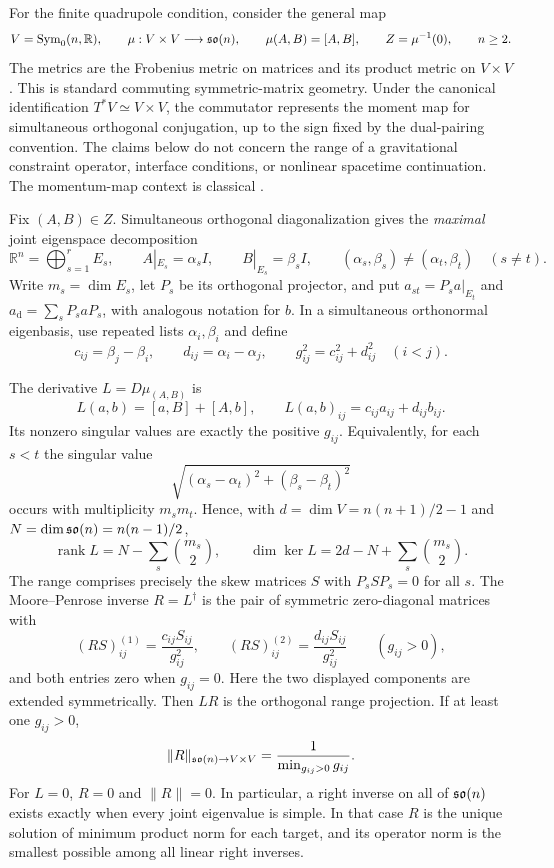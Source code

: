 For the finite quadrupole condition, consider the general map
\[
 V=\operatorname{Sym}_0(n,\mathbb R),\qquad
 \mu:V\times V\longrightarrow\mathfrak{so}(n),\qquad \mu(A,B)=[A,B],
 \qquad Z=\mu^{-1}(0),\qquad n\geq2.
\]
The metrics are the Frobenius metric on matrices and its product metric on
$V\times V$.  This is standard commuting symmetric-matrix geometry.  Under
the canonical identification $T^*V\simeq V\times V$, the commutator represents
the moment map for simultaneous orthogonal conjugation, up to the sign fixed
by the dual-pairing convention.  The claims below do not concern the range
of a gravitational constraint operator, interface conditions, or nonlinear
spacetime continuation.  The momentum-map context is classical \cite{ArmsMarsdenMoncrief1981}.

Fix $(A,B)\in Z$.  Simultaneous orthogonal diagonalization gives the
\emph{maximal} joint eigenspace decomposition
\[
 \mathbb R^n=\bigoplus_{s=1}^r E_s,\qquad
 A|_{E_s}=\alpha_s I,\qquad B|_{E_s}=\beta_s I,
 \qquad (\alpha_s,\beta_s)\ne(\alpha_t,\beta_t)\quad(s\ne t).
\]
Write $m_s=\dim E_s$, let $P_s$ be its orthogonal projector, and put
$a_{st}=P_s a|_{E_t}$ and $a_{\mathrm d}=\sum_sP_saP_s$, with analogous
notation for $b$.  In a simultaneous orthonormal eigenbasis, use repeated
lists $\alpha_i,\beta_i$ and define
\[
 c_{ij}=\beta_j-\beta_i,\qquad d_{ij}=\alpha_i-\alpha_j,
 \qquad g_{ij}^2=c_{ij}^2+d_{ij}^2\quad(i<j).
\]

\begin{proposition}\label{prop:inverse}
The derivative $L=D\mu_{(A,B)}$ is
\[
 L(a,b)=[a,B]+[A,b],\qquad L(a,b)_{ij}=c_{ij}a_{ij}+d_{ij}b_{ij}.
\]
Its nonzero singular values are exactly the positive $g_{ij}$.  Equivalently,
for each $s<t$ the singular value
\[
 \sqrt{(\alpha_s-\alpha_t)^2+(\beta_s-\beta_t)^2}
\]
occurs with multiplicity $m_s m_t$.  Hence, with
$d=\dim V=n(n+1)/2-1$ and $N=\dim\mathfrak{so}(n)=n(n-1)/2$,
\[
 \operatorname{rank} L=N-\sum_s\binom{m_s}{2},\qquad
 \dim\ker L=2d-N+\sum_s\binom{m_s}{2}.
\]
The range comprises precisely the skew matrices $S$ with $P_sSP_s=0$ for
all $s$.  The Moore--Penrose inverse $R=L^\dagger$ is the pair of symmetric
zero-diagonal matrices with
\[
 (RS)^{(1)}_{ij}=\frac{c_{ij}S_{ij}}{g_{ij}^2},\qquad
 (RS)^{(2)}_{ij}=\frac{d_{ij}S_{ij}}{g_{ij}^2}\qquad(g_{ij}>0),
\]
and both entries zero when $g_{ij}=0$.  Here the two displayed components
are extended symmetrically.  Then $LR$ is the orthogonal range projection.
If at least one $g_{ij}>0$,
\[
 \|R\|_{\mathfrak{so}(n)\to V\times V}
   =\frac{1}{\min_{g_{ij}>0}g_{ij}}.
\]
For $L=0$, $R=0$ and $\|R\|=0$.  In particular, a right inverse on all of
$\mathfrak{so}(n)$ exists exactly when every joint eigenvalue is simple.  In that
case $R$ is the unique solution of minimum product norm for each target,
and its operator norm is the smallest possible among all linear right
inverses.
\end{proposition}

